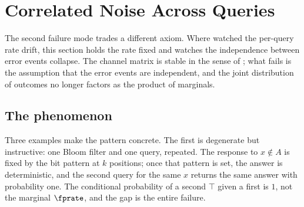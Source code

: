 %
%
%

\section{Correlated Noise Across Queries}
\label{sec:correlated-noise}

The second failure mode trades a different axiom. Where
 watched the per-query rate drift, this section
holds the rate fixed and watches the independence between error events
collapse. The channel matrix is stable in the sense of
; what fails is the assumption that the error events
are independent, and the joint distribution of outcomes no longer factors
as the product of marginals.

\subsection*{The phenomenon}

Three examples make the pattern concrete. The first is degenerate but
instructive: one Bloom filter and one query, repeated. The response to
$x \notin A$ is fixed by the bit pattern at $k$ positions; once that
pattern is set, the answer is deterministic, and the second query for the
same $x$ returns the same answer with probability one. The conditional
probability of a second $\top$ given a first is $1$, not the marginal
$\fprate$, and the gap is the entire failure.

